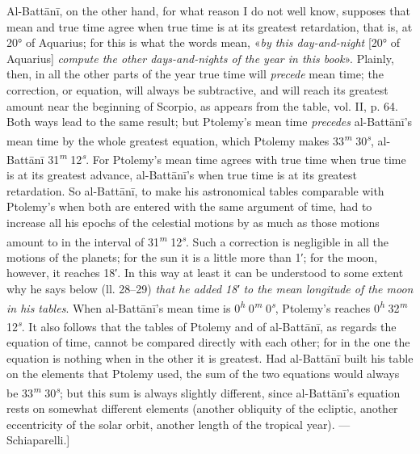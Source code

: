 \documentclass[11pt]{article}
\begin{document}
\par Al-Battānī, on the other hand, for what reason I do not well know, supposes that mean and true time agree when true time is at its greatest retardation, that is, at 20° of Aquarius; for this is what the words mean, «\emph{by this day-and-night} [20° of Aquarius] \emph{compute the other days-and-nights of the year in this book}». Plainly, then, in all the other parts of the year true time will \emph{precede} mean time; the correction, or equation, will always be subtractive, and will reach its greatest amount near the beginning of Scorpio, as appears from the table, vol. II, p. 64. Both ways lead to the same result; but Ptolemy's mean time \emph{precedes} al-Battānī's mean time by the whole greatest equation, which Ptolemy makes 33\textsuperscript{\itshape m} 30\textsuperscript{\itshape s}, al-Battānī 31\textsuperscript{\itshape m} 12\textsuperscript{\itshape s}. For Ptolemy's mean time agrees with true time when true time is at its greatest advance, al-Battānī's when true time is at its greatest retardation. So al-Battānī, to make his astronomical tables comparable with Ptolemy's when both are entered with the same argument of time, had to increase all his epochs of the celestial motions by as much as those motions amount to in the interval of 31\textsuperscript{\itshape m} 12\textsuperscript{\itshape s}. Such a correction is negligible in all the motions of the planets; for the sun it is a little more than 1′; for the moon, however, it reaches 18′. In this way at least it can be understood to some extent why he says below (ll. 28–29) \emph{that he added 18′ to the mean longitude of the moon in his tables}. When al-Battānī's mean time is 0\textsuperscript{\itshape h} 0\textsuperscript{\itshape m} 0\textsuperscript{\itshape s}, Ptolemy's reaches 0\textsuperscript{\itshape h} 32\textsuperscript{\itshape m} 12\textsuperscript{\itshape s}. It also follows that the tables of Ptolemy and of al-Battānī, as regards the equation of time, cannot be compared directly with each other; for in the one the equation is nothing when in the other it is greatest. Had al-Battānī built his table on the elements that Ptolemy used, the sum of the two equations would always be 33\textsuperscript{\itshape m} 30\textsuperscript{\itshape s}; but this sum is always slightly different, since al-Battānī's equation rests on somewhat different elements (another obliquity of the ecliptic, another eccentricity of the solar orbit, another length of the tropical year). — Schiaparelli.]\par
\end{document}

